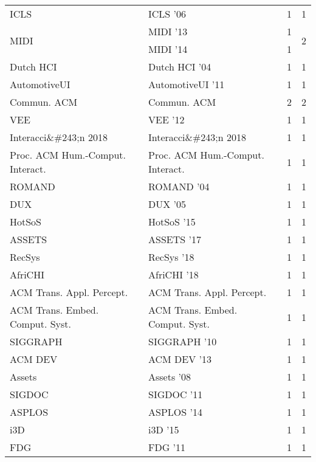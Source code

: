 \begin{table*}[t]
\begin{tabular}{llrr}
\multirow{1}{*}{ICLS } & ICLS '06 & 1 & \multirow{1}{*}{1}\\
\multirow{2}{*}{MIDI } & MIDI '13 & 1 & \multirow{2}{*}{2}\\
& MIDI '14 & 1 &\\
\multirow{1}{*}{Dutch HCI } & Dutch HCI '04 & 1 & \multirow{1}{*}{1}\\
\multirow{1}{*}{AutomotiveUI } & AutomotiveUI '11 & 1 & \multirow{1}{*}{1}\\
\multirow{1}{*}{Commun. ACM} & Commun. ACM & 2 & \multirow{1}{*}{2}\\
\multirow{1}{*}{VEE } & VEE '12 & 1 & \multirow{1}{*}{1}\\
\multirow{1}{*}{Interacci\&\#243;n 2018} & Interacci\&\#243;n 2018 & 1 & \multirow{1}{*}{1}\\
\multirow{1}{*}{Proc. ACM Hum.-Comput. Interact.} & Proc. ACM Hum.-Comput. Interact. & 1 & \multirow{1}{*}{1}\\
\multirow{1}{*}{ROMAND } & ROMAND '04 & 1 & \multirow{1}{*}{1}\\
\multirow{1}{*}{DUX } & DUX '05 & 1 & \multirow{1}{*}{1}\\
\multirow{1}{*}{HotSoS } & HotSoS '15 & 1 & \multirow{1}{*}{1}\\
\multirow{1}{*}{ASSETS } & ASSETS '17 & 1 & \multirow{1}{*}{1}\\
\multirow{1}{*}{RecSys } & RecSys '18 & 1 & \multirow{1}{*}{1}\\
\multirow{1}{*}{AfriCHI } & AfriCHI '18 & 1 & \multirow{1}{*}{1}\\
\multirow{1}{*}{ACM Trans. Appl. Percept.} & ACM Trans. Appl. Percept. & 1 & \multirow{1}{*}{1}\\
\multirow{1}{*}{ACM Trans. Embed. Comput. Syst.} & ACM Trans. Embed. Comput. Syst. & 1 & \multirow{1}{*}{1}\\
\multirow{1}{*}{SIGGRAPH } & SIGGRAPH '10 & 1 & \multirow{1}{*}{1}\\
\multirow{1}{*}{ACM DEV } & ACM DEV '13 & 1 & \multirow{1}{*}{1}\\
\multirow{1}{*}{Assets } & Assets '08 & 1 & \multirow{1}{*}{1}\\
\multirow{1}{*}{SIGDOC } & SIGDOC '11 & 1 & \multirow{1}{*}{1}\\
\multirow{1}{*}{ASPLOS } & ASPLOS '14 & 1 & \multirow{1}{*}{1}\\
\multirow{1}{*}{i3D } & i3D '15 & 1 & \multirow{1}{*}{1}\\
\multirow{1}{*}{FDG } & FDG '11 & 1 & \multirow{1}{*}{1}\\

\end{tabular}
\end{table*}
